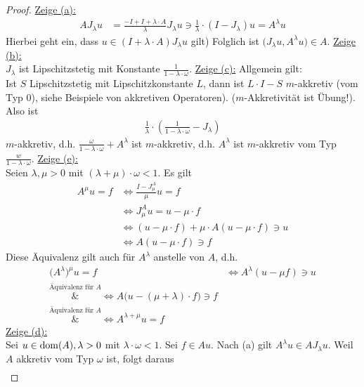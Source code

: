\begin{proof}
	\underline{Zeige (a):}
	\begin{align*}
		A J_\lambda u
		&=\frac{-I+I+\lambda\cdot A}{\lambda}J_\lambda u
		\ni\frac{1}{\lambda}\cdot(I-J_\lambda)u
		=A^\lambda u
	\end{align*}
	Hierbei geht ein, dass $u\in(I+\lambda\cdot A)J_\lambda u$ gilt)
	Folglich ist $\big(J_\lambda u,A^\lambda u\big)\in A$.\nl
	\underline{Zeige (b):}\\
	$J_\lambda$ ist Lipschitzstetig mit Konstante $\frac{1}{1-\lambda\cdot\omega}$.\nl
	\underline{Zeige (c):}
	Allgemein gilt:\\
	Ist $S$ Lipschitzstetig mit Lipschitzkonstante $L$, dann ist $L\cdot I-S$ $m$-akkretiv (vom Typ 0), siehe Beispiele von akkretiven Operatoren). ($m$-Akkretivität ist Übung!). Also ist
	\begin{align*}
		\frac{1}{\lambda}\cdot\left(\frac{1}{1-\lambda\cdot\omega}-J_\lambda\right)
	\end{align*}
	$m$-akkretiv, d.h. $\frac{\omega}{1-\lambda\cdot\omega}+A^\lambda$ ist $m$-akkretiv, d.h. $A^\lambda$ ist $m$-akkretiv vom Typ $\frac{w}{1-\lambda\cdot\omega}$.\nl
	\underline{Zeige (e):}\\
	Seien $\lambda,\mu>0$ mit $(\lambda+\mu)\cdot\omega<1$.
	Es gilt
	\begin{align*}
		A^\mu u=f
		&\Longleftrightarrow \frac{I-J_\mu^A}{\mu} u=f\\
		&\Longleftrightarrow J_\mu^A u=u-\mu\cdot f\\
		&\Longleftrightarrow(u-\mu\cdot f)+\mu\cdot A(u-\mu\cdot f)\ni u\\
		&\Longleftrightarrow A(u-\mu\cdot f)\ni f
	\end{align*}
	Diese Äquivalenz gilt auch für $A^\lambda$ anstelle von $A$, d.h.
	\begin{align*}
		\big(A^\lambda)^\mu u=f
		&\Longleftrightarrow A^\lambda(u-\mu f)\ni u\\
		\overset{\text{Äquivalenz für }A}&{\Longleftrightarrow}
		A\big(u-(\mu+\lambda)\cdot f\big)\ni f\\
		\overset{\text{Äquivalenz für }A}&{\Longleftrightarrow}
		A^{\lambda+\mu} u=f
	\end{align*}
	\underline{Zeige (d):}\\
	Sei $u\in\operatorname{dom}(A),\lambda>0$ mit $\lambda\cdot\omega<1$.
	Sei $f\in A u$.
	Nach (a) gilt $A^\lambda u\in A J_\lambda u$.
	Weil $A$ akkretiv vom Typ $\omega$ ist, folgt daraus 
	\begin{align*}

\end{align*}
\end{proof}
